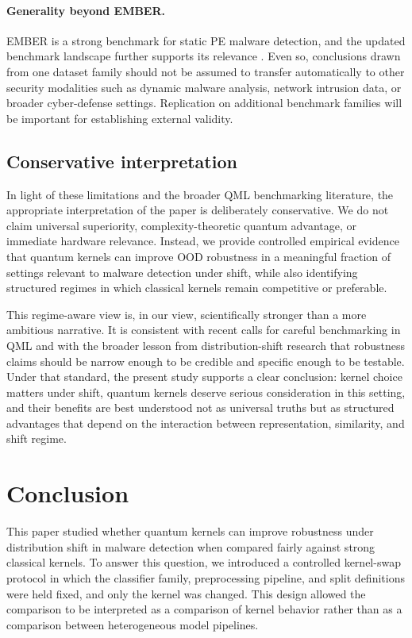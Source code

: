 \documentclass[pdflatex,sn-mathphys-num]{sn-jnl}%
\theoremstyle{thmstyleone}%
\theoremstyle{thmstyletwo}%
\theoremstyle{thmstylethree}%
\begin{document}
\paragraph{Generality beyond EMBER.}
EMBER is a strong benchmark for static PE malware detection, and the updated benchmark landscape further supports its relevance \cite{anderson2018ember,joyce2025ember2024}. Even so, conclusions drawn from one dataset family should not be assumed to transfer automatically to other security modalities such as dynamic malware analysis, network intrusion data, or broader cyber-defense settings. Replication on additional benchmark families will be important for establishing external validity.

\subsection{Conservative interpretation}

In light of these limitations and the broader QML benchmarking literature, the appropriate interpretation of the paper is deliberately conservative. We do not claim universal superiority, complexity-theoretic quantum advantage, or immediate hardware relevance. Instead, we provide controlled empirical evidence that quantum kernels can improve OOD robustness in a meaningful fraction of settings relevant to malware detection under shift, while also identifying structured regimes in which classical kernels remain competitive or preferable.

This regime-aware view is, in our view, scientifically stronger than a more ambitious narrative. It is consistent with recent calls for careful benchmarking in QML \cite{bowles2024betterthanclassical,schnabel2025scrutiny} and with the broader lesson from distribution-shift research that robustness claims should be narrow enough to be credible and specific enough to be testable. Under that standard, the present study supports a clear conclusion: kernel choice matters under shift, quantum kernels deserve serious consideration in this setting, and their benefits are best understood not as universal truths but as structured advantages that depend on the interaction between representation, similarity, and shift regime.


\section{Conclusion}
\label{sec:conclusion}

This paper studied whether quantum kernels can improve robustness under distribution shift in malware detection when compared fairly against strong classical kernels. To answer this question, we introduced a controlled kernel-swap protocol in which the classifier family, preprocessing pipeline, and split definitions were held fixed, and only the kernel was changed. This design allowed the comparison to be interpreted as a comparison of kernel behavior rather than as a comparison between heterogeneous model pipelines.
\end{document}
